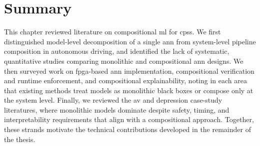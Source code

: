 \section{Summary}

This chapter reviewed literature on compositional \gls{ml} for \glspl{cps}. We first distinguished model-level decomposition of a single \gls{ann} from system-level pipeline composition in autonomous driving, and identified the lack of systematic, quantitative studies comparing monolithic and compositional \gls{ann} designs. We then surveyed work on \gls{fpga}-based \gls{ann} implementation, compositional verification and runtime enforcement, and compositional explainability, noting in each area that existing methods treat models as monolithic black boxes or compose only at the system level. Finally, we reviewed the \gls{av} and depression case-study literatures, where monolithic models dominate despite safety, timing, and interpretability requirements that align with a compositional approach. Together, these strands motivate the technical contributions developed in the remainder of the thesis.

